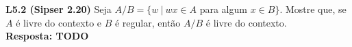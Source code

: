 
\noindent \textbf{L5.2 (Sipser 2.20)} Seja $A/B = \{w \ |\ wx \in A$ para algum $x \in B\}$. Mostre que, se $A$ é livre do contexto e $B$ é regular, então $A/B$ é livre do contexto.\\[3pt]
\textbf{Resposta: TODO}

